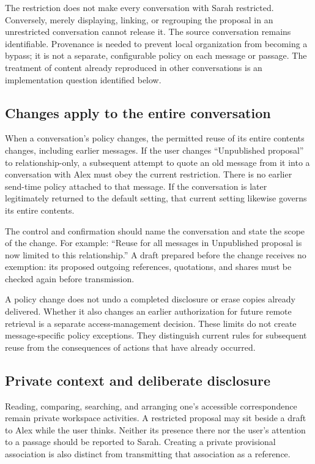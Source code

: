 \documentclass[11pt]{article}
\begin{document}
The restriction does not make every conversation with Sarah restricted. Conversely, merely displaying, linking, or regrouping the proposal in an unrestricted conversation cannot release it. The source conversation remains identifiable. Provenance is needed to prevent local organization from becoming a bypass; it is not a separate, configurable policy on each message or passage. The treatment of content already reproduced in other conversations is an implementation question identified below.

\subsection{Changes apply to the entire conversation}

When a conversation's policy changes, the permitted reuse of its entire contents changes, including earlier messages. If the user changes ``Unpublished proposal'' to relationship-only, a subsequent attempt to quote an old message from it into a conversation with Alex must obey the current restriction. There is no earlier send-time policy attached to that message. If the conversation is later legitimately returned to the default setting, that current setting likewise governs its entire contents.

The control and confirmation should name the conversation and state the scope of the change. For example: ``Reuse for all messages in Unpublished proposal is now limited to this relationship.'' A draft prepared before the change receives no exemption: its proposed outgoing references, quotations, and shares must be checked again before transmission.

A policy change does not undo a completed disclosure or erase copies already delivered. Whether it also changes an earlier authorization for future remote retrieval is a separate access-management decision. These limits do not create message-specific policy exceptions. They distinguish current rules for subsequent reuse from the consequences of actions that have already occurred.

\subsection{Private context and deliberate disclosure}

Reading, comparing, searching, and arranging one's accessible correspondence remain private workspace activities. A restricted proposal may sit beside a draft to Alex while the user thinks. Neither its presence there nor the user's attention to a passage should be reported to Sarah. Creating a private provisional association is also distinct from transmitting that association as a reference.
\end{document}
